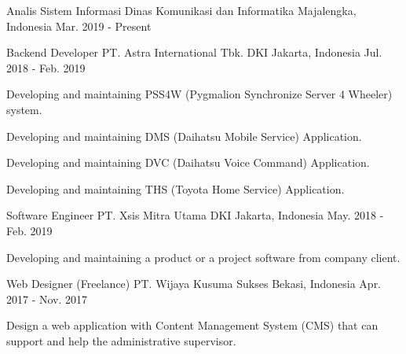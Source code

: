 \begin{cventries}

  \cventry
    {Analis Sistem Informasi} %
    {Dinas Komunikasi dan Informatika} %
    {Majalengka, Indonesia} %
    {Mar. 2019 - Present} %
    {
    }

  \cventry
    {Backend Developer} %
    {PT. Astra International Tbk.} %
    {DKI Jakarta, Indonesia} %
    {Jul. 2018 - Feb. 2019} %
    {
      \begin{cvitems} %
        \item {Developing and maintaining PSS4W (Pygmalion Synchronize Server 4 Wheeler) system.}
        \item {Developing and maintaining DMS (Daihatsu Mobile Service) Application.}
        \item {Developing and maintaining DVC (Daihatsu Voice Command) Application.}
        \item {Developing and maintaining THS (Toyota Home Service) Application.}
      \end{cvitems}
    }

  \cventry
    {Software Engineer} %
    {PT. Xsis Mitra Utama} %
    {DKI Jakarta, Indonesia} %
    {May. 2018 - Feb. 2019} %
    {
      \begin{cvitems} %
        \item {Developing and maintaining a product or a project software from company client.}
      \end{cvitems}
    }

  \cventry
    {Web Designer (Freelance)} %
    {PT. Wijaya Kusuma Sukses} %
    {Bekasi, Indonesia} %
    {Apr. 2017 - Nov. 2017} %
    {
      \begin{cvitems} %
        \item {Design a web application with Content Management System (CMS) that can support and help the administrative supervisor.}
      \end{cvitems}
    }


\end{cventries}
